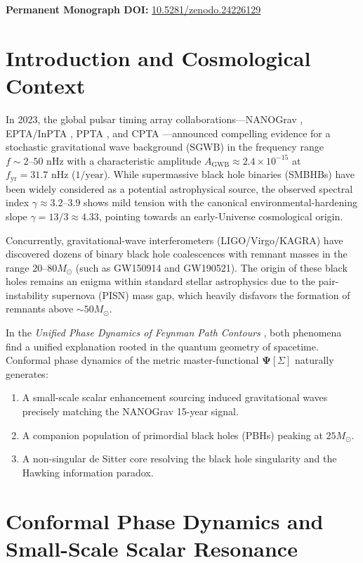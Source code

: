 \documentclass[11pt,a4paper]{article}
\begin{document}
\noindent\textbf{Permanent Monograph DOI:} \href{https://doi.org/10.5281/zenodo.24226129}{10.5281/zenodo.24226129}

\section{Introduction and Cosmological Context}

In 2023, the global pulsar timing array collaborations—NANOGrav \cite{nanograv15}, EPTA/InPTA \cite{epta2}, PPTA \cite{ppta3}, and CPTA \cite{cpta}—announced compelling evidence for a stochastic gravitational wave background (SGWB) in the frequency range $f \sim 2\text{--}50\text{ nHz}$ with a characteristic amplitude $A_{\mathrm{GWB}} \approx 2.4 \times 10^{-15}$ at $f_{\mathrm{yr}} = 31.7\text{ nHz}$ ($1/\text{year}$). While supermassive black hole binaries (SMBHBs) have been widely considered as a potential astrophysical source, the observed spectral index $\gamma \approx 3.2\text{--}3.9$ shows mild tension with the canonical environmental-hardening slope $\gamma = 13/3 \approx 4.33$, pointing towards an early-Universe cosmological origin.

Concurrently, gravitational-wave interferometers (LIGO/Virgo/KAGRA) have discovered dozens of binary black hole coalescences with remnant masses in the range $20\text{--}80 M_\odot$ (such as GW150914 and GW190521). The origin of these black holes remains an enigma within standard stellar astrophysics due to the pair-instability supernova (PISN) mass gap, which heavily disfavors the formation of remnants above $\sim 50 M_\odot$.

In the \textit{Unified Phase Dynamics of Feynman Path Contours} \cite{pavliuk_monograph}, both phenomena find a unified explanation rooted in the quantum geometry of spacetime. Conformal phase dynamics of the metric master-functional $\mathbf{\Psi}[\Sigma]$ naturally generates:
\begin{enumerate}
    \item A small-scale scalar enhancement sourcing induced gravitational waves precisely matching the NANOGrav 15-year signal.
    \item A companion population of primordial black holes (PBHs) peaking at $25 M_\odot$.
    \item A non-singular de Sitter core resolving the black hole singularity and the Hawking information paradox.
\end{enumerate}

\section{Conformal Phase Dynamics and Small-Scale Scalar Resonance}
\end{document}
